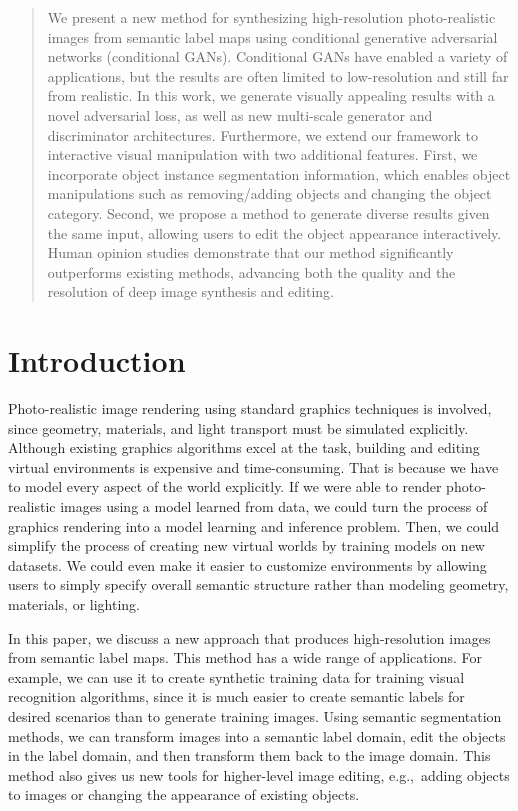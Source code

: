 \documentclass[10pt,twocolumn,letterpaper]{article}
\newcommand{\lblsec}[1]{\label{sec:#1}}
\begin{document}
\begin{abstract}
\vspace{-.1in}
We present a new method for synthesizing high-resolution photo-realistic images from semantic label maps using conditional generative adversarial networks (conditional GANs). Conditional GANs have enabled a variety of applications, but the results are often limited to low-resolution and still far from realistic. In this work, we generate  visually appealing results with a novel adversarial loss, as well as new multi-scale generator and discriminator architectures. Furthermore, we extend our framework to interactive visual manipulation with two additional features. First, we incorporate object instance segmentation information, which enables object manipulations such as removing/adding objects and changing the object category. Second, we propose a method to generate diverse results given the same input, allowing users to edit the object appearance interactively. Human opinion studies demonstrate that our method significantly outperforms existing methods, advancing both the quality and the resolution of deep image synthesis and editing.
\end{abstract}

\vspace{-.2in}
\section{Introduction} \lblsec{intro}

Photo-realistic image rendering using standard graphics techniques is involved, since geometry, materials, and light transport must be simulated explicitly. Although existing graphics algorithms excel at the task, building and editing virtual environments is expensive and time-consuming. That is because we have to model every aspect of the world explicitly. If we were able to render photo-realistic images using a model learned from data, we could turn the process of graphics rendering into a model learning and inference problem. Then, we could simplify the process of creating new virtual worlds by training models on new datasets. We could even make it easier to customize environments by allowing users to simply specify overall semantic structure rather than modeling geometry, materials, or lighting. 

In this paper, we discuss a new approach that produces high-resolution images from semantic label maps. This method has a wide range of applications. For example, we can use it to create synthetic training data for training visual recognition algorithms, since it is much easier to create semantic labels for desired scenarios than to generate training images. Using semantic segmentation methods, we can transform images into a semantic label domain, edit the objects in the label domain, and then transform them back to the image domain. This method also gives us new tools for higher-level image editing, e.g.,\ adding objects to images or changing the appearance of existing objects.
\end{document}
